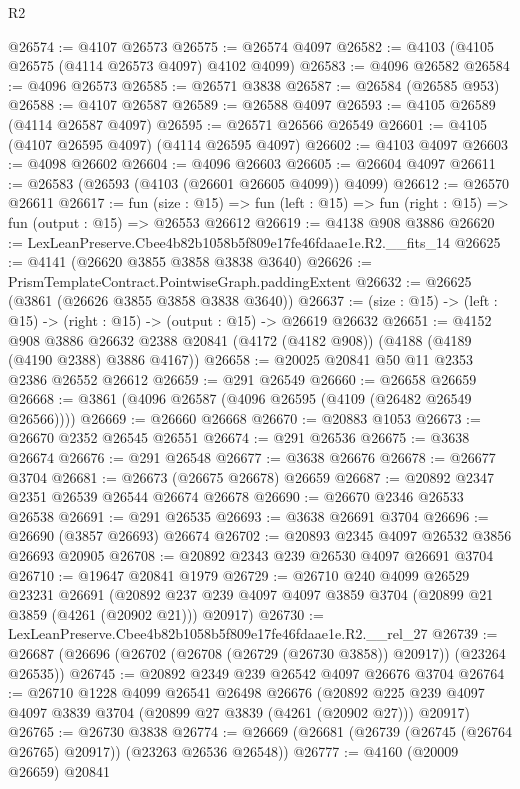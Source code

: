 \begin{lexlean}{R2}
\begin{coremodule}
@26574 := @4107 @26573
@26575 := @26574 @4097
@26582 := @4103 (@4105 @26575 (@4114 @26573 @4097) @4102 @4099)
@26583 := @4096 @26582
@26584 := @4096 @26573
@26585 := @26571 @3838
@26587 := @26584 (@26585 @953)
@26588 := @4107 @26587
@26589 := @26588 @4097
@26593 := @4105 @26589 (@4114 @26587 @4097)
@26595 := @26571 @26566 @26549
@26601 := @4105 (@4107 @26595 @4097) (@4114 @26595 @4097)
@26602 := @4103 @4097
@26603 := @4098 @26602
@26604 := @4096 @26603
@26605 := @26604 @4097
@26611 := @26583 (@26593 (@4103 (@26601 @26605 @4099)) @4099)
@26612 := @26570 @26611
@26617 := fun (size : @15) =>
  fun (left : @15) => fun (right : @15) => fun (output : @15) => @26553 @26612
@26619 := @4138 @908 @3886
@26620 := LexLeanPreserve.Cbee4b82b1058b5f809e17fe46fdaae1e.R2.__fits_14
@26625 := @4141 (@26620 @3855 @3858 @3838 @3640)
@26626 := PrismTemplateContract.PointwiseGraph.paddingExtent
@26632 := @26625 (@3861 (@26626 @3855 @3858 @3838 @3640))
@26637 := (size : @15) -> (left : @15) -> (right : @15) -> (output : @15) -> @26619 @26632
@26651 := @4152
    @908
    @3886
    @26632
    @2388
    @20841
    (@4172 (@4182 @908))
    (@4188 (@4189 (@4190 @2388) @3886 @4167))
@26658 := @20025 @20841 @50 @11 @2353 @2386 @26552 @26612
@26659 := @291 @26549
@26660 := @26658 @26659
@26668 := @3861 (@4096 @26587 (@4096 @26595 (@4109 (@26482 @26549 @26566))))
@26669 := @26660 @26668
@26670 := @20883 @1053
@26673 := @26670 @2352 @26545 @26551
@26674 := @291 @26536
@26675 := @3638 @26674
@26676 := @291 @26548
@26677 := @3638 @26676
@26678 := @26677 @3704
@26681 := @26673 (@26675 @26678) @26659
@26687 := @20892 @2347 @2351 @26539 @26544 @26674 @26678
@26690 := @26670 @2346 @26533 @26538
@26691 := @291 @26535
@26693 := @3638 @26691 @3704
@26696 := @26690 (@3857 @26693) @26674
@26702 := @20893 @2345 @4097 @26532 @3856 @26693 @20905
@26708 := @20892 @2343 @239 @26530 @4097 @26691 @3704
@26710 := @19647 @20841 @1979
@26729 := @26710
    @240
    @4099
    @26529
    @23231
    @26691
    (@20892 @237 @239 @4097 @4097 @3859 @3704 (@20899 @21 @3859 (@4261 (@20902 @21))) @20917)
@26730 := LexLeanPreserve.Cbee4b82b1058b5f809e17fe46fdaae1e.R2.__rel_27
@26739 := @26687 (@26696 (@26702 (@26708 (@26729 (@26730 @3858)) @20917)) (@23264 @26535))
@26745 := @20892 @2349 @239 @26542 @4097 @26676 @3704
@26764 := @26710
    @1228
    @4099
    @26541
    @26498
    @26676
    (@20892 @225 @239 @4097 @4097 @3839 @3704 (@20899 @27 @3839 (@4261 (@20902 @27))) @20917)
@26765 := @26730 @3838
@26774 := @26669 (@26681 (@26739 (@26745 (@26764 @26765) @20917)) (@23263 @26536 @26548))
@26777 := @4160 (@20009 @26659) @20841

\end{coremodule}
\end{lexlean}
